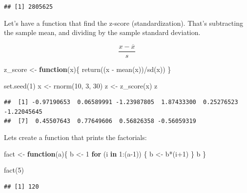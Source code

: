\documentclass[
]{book}
\newenvironment{Shaded}{\begin{snugshade}}{\end{snugshade}}
\newcommand{\ControlFlowTok}[1]{\textcolor[rgb]{0.13,0.29,0.53}{\textbf{#1}}}
\newcommand{\DecValTok}[1]{\textcolor[rgb]{0.00,0.00,0.81}{#1}}
\newcommand{\FunctionTok}[1]{\textcolor[rgb]{0.00,0.00,0.00}{#1}}
\newcommand{\NormalTok}[1]{#1}
\newcommand{\OtherTok}[1]{\textcolor[rgb]{0.56,0.35,0.01}{#1}}
\newcommand{\SpecialCharTok}[1]{\textcolor[rgb]{0.00,0.00,0.00}{#1}}
\theoremstyle{definition}
\theoremstyle{definition}
\theoremstyle{definition}
\theoremstyle{definition}
\theoremstyle{remark}
\begin{document}
\begin{verbatim}
## [1] 2805625
\end{verbatim}

Let's have a function that find the z-score (standardization). That's subtracting the sample mean, and dividing by the sample standard deviation.

\[
\frac{x-\overline{x}}{s}
\]

\begin{Shaded}
\begin{Highlighting}[]
\NormalTok{z\_score }\OtherTok{\textless{}{-}} \ControlFlowTok{function}\NormalTok{(x)\{}
  \FunctionTok{return}\NormalTok{((x }\SpecialCharTok{{-}} \FunctionTok{mean}\NormalTok{(x))}\SpecialCharTok{/}\FunctionTok{sd}\NormalTok{(x))}
\NormalTok{\}}

\FunctionTok{set.seed}\NormalTok{(}\DecValTok{1}\NormalTok{)}
\NormalTok{x }\OtherTok{\textless{}{-}} \FunctionTok{rnorm}\NormalTok{(}\DecValTok{10}\NormalTok{, }\DecValTok{3}\NormalTok{, }\DecValTok{30}\NormalTok{)}
\NormalTok{z }\OtherTok{\textless{}{-}} \FunctionTok{z\_score}\NormalTok{(x)}
\NormalTok{z}
\end{Highlighting}
\end{Shaded}

\begin{verbatim}
##  [1] -0.97190653  0.06589991 -1.23987805  1.87433300  0.25276523 -1.22045645
##  [7]  0.45507643  0.77649606  0.56826358 -0.56059319
\end{verbatim}

Lets create a function that prints the factorials:

\begin{Shaded}
\begin{Highlighting}[]
\NormalTok{fact }\OtherTok{\textless{}{-}} \ControlFlowTok{function}\NormalTok{(a)\{}
\NormalTok{  b }\OtherTok{\textless{}{-}} \DecValTok{1}
  \ControlFlowTok{for}\NormalTok{ (i }\ControlFlowTok{in} \DecValTok{1}\SpecialCharTok{:}\NormalTok{(a}\DecValTok{{-}1}\NormalTok{)) \{}
\NormalTok{    b }\OtherTok{\textless{}{-}}\NormalTok{ b}\SpecialCharTok{*}\NormalTok{(i}\SpecialCharTok{+}\DecValTok{1}\NormalTok{) }
\NormalTok{  \}}
\NormalTok{  b}
\NormalTok{\}}

\FunctionTok{fact}\NormalTok{(}\DecValTok{5}\NormalTok{)}
\end{Highlighting}
\end{Shaded}

\begin{verbatim}
## [1] 120
\end{verbatim}
\end{document}
